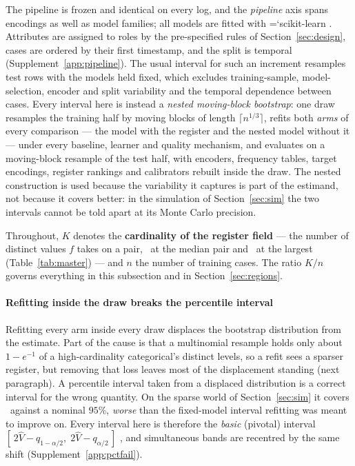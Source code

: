 \documentclass[11pt,3p,review,authoryear]{elsarticle}
\DeclareRobustCommand\texttt[1]{%
  {\ttfamily\hyphenchar\font=`\-\relax #1}}
\theoremstyle{definition}
\begin{document}
The pipeline is frozen and identical on every log, and the \emph{pipeline}
axis spans encodings as well as model families; all models are fitted with
\texttt{scikit-learn} \citep{pedregosa2011scikit}. Attributes are assigned to roles by the
pre-specified rules of Section~\ref{sec:design}, cases are ordered by their
first timestamp, and the split is temporal (Supplement~\ref{app:pipeline}).
The usual interval for such an increment resamples test rows with the models
held fixed, which excludes training-sample, model-selection, encoder and
split variability and the temporal dependence between cases. Every interval
here is instead a \emph{nested moving-block bootstrap}: one draw resamples
the training half by moving blocks \citep{kunsch1989jackknife} of length
$\lceil n^{1/3} \rceil$, refits both \emph{arms} of every comparison --- the
model with the register and the nested model without it --- under every
baseline, learner and quality mechanism, and evaluates on a moving-block
resample of the test half, with encoders, frequency tables, target
encodings, register rankings and calibrators rebuilt inside the draw. The
nested construction is used because the variability it captures is part of
the estimand, not because it covers better: in the simulation of
Section~\ref{sec:sim} the two intervals cannot be told apart at its Monte
Carlo precision.

\noindent Throughout, $K$ denotes the \textbf{cardinality of the register
field} --- the number of distinct values $f$ takes on a pair, \cardFMedian\ at
the median pair and \cardFMax\ at the largest (Table~\ref{tab:master}) --- and
$n$ the number of training cases. The ratio $K/n$ governs everything in this
subsection and in Section~\ref{sec:regions}.

\paragraph{Refitting inside the draw breaks the percentile interval}
Refitting every arm inside every draw displaces the bootstrap distribution
from the estimate. Part of the cause is that a multinomial resample holds
only about $1 - e^{-1}$ of a high-cardinality categorical's distinct levels,
so a refit sees a sparser register, but removing that loss leaves most of
the displacement standing (next paragraph). A percentile interval taken from
a displaced distribution is a correct interval for the wrong quantity. On the sparse world of Section~\ref{sec:sim} it covers
\coverageSparsePct\ against a nominal $95\%$, \emph{worse} than the
fixed-model interval refitting was meant to improve on. Every interval here
is therefore the \emph{basic} (pivotal) interval
$[\,2\hat{V} - q_{1-\alpha/2},\; 2\hat{V} - q_{\alpha/2}\,]$
\citep{davison1997bootstrap}, and simultaneous bands are recentred by the
same shift (Supplement~\ref{app:pctfail}).
\end{document}
